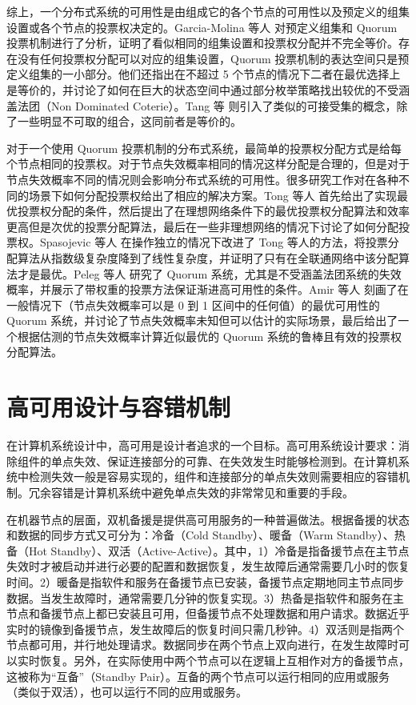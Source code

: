综上，一个分布式系统的可用性是由组成它的各个节点的可用性以及预定义的组集设置或各个节点的投票权决定的。Garcia-Molina 等人 \cite{Garcia-Molina:1985:AVD:4221.4223} 对预定义组集和 Quorum 投票机制进行了分析，证明了看似相同的组集设置和投票权分配并不完全等价。存在没有任何投票权分配可以对应的组集设置，Quorum 投票机制的表达空间只是预定义组集的一小部分。他们还指出在不超过 5 个节点的情况下二者在最优选择上是等价的，并讨论了如何在巨大的状态空间中通过部分枚举策略找出较优的不受涵盖法团（Non Dominated Coterie）。Tang 等 \cite{Tang:1989:SPS:67544.67809} 则引入了类似的可接受集的概念，除了一些明显不可取的组合，这同前者是等价的。

对于一个使用 Quorum 投票机制的分布式系统，最简单的投票权分配方式是给每个节点相同的投票权。对于节点失效概率相同的情况这样分配是合理的，但是对于节点失效概率不同的情况则会影响分布式系统的可用性。很多研究工作对在各种不同的场景下如何分配投票权给出了相应的解决方案。Tong 等人 \cite{25789} 首先给出了实现最优投票权分配的条件，然后提出了在理想网络条件下的最优投票权分配算法和效率更高但是次优的投票分配算法，最后在一些非理想网络的情况下讨论了如何分配投票权。Spasojevic 等人 \cite{262589} 在操作独立的情况下改进了 Tong 等人的方法，将投票分配算法从指数级复杂度降到了线性复杂度，并证明了只有在全联通网络中该分配算法才是最优。Peleg 等人 \cite{Peleg1995210} 研究了 Quorum 系统，尤其是不受涵盖法团系统的失效概率，并展示了带权重的投票方法保证渐进高可用性的条件。Amir 等人 \cite{Amir1998223} 刻画了在一般情况下（节点失效概率可以是 0 到 1 区间中的任何值）的最优可用性的 Quorum 系统，并讨论了节点失效概率未知但可以估计的实际场景，最后给出了一个根据估测的节点失效概率计算近似最优的 Quorum 系统的鲁棒且有效的投票权分配算法。

\section{高可用设计与容错机制}
在计算机系统设计中，高可用是设计者追求的一个目标。高可用系统设计要求：消除组件的单点失效、保证连接部分的可靠、在失效发生时能够检测到。在计算机系统中检测失效一般是容易实现的，组件和连接部分的单点失效则需要相应的容错机制。冗余容错是计算机系统中避免单点失效的非常常见和重要的手段。

在机器节点的层面，双机备援是提供高可用服务的一种普遍做法。根据备援的状态和数据的同步方式又可分为：冷备（Cold Standby）、暖备（Warm Standby）、热备（Hot Standby）、双活（Active-Active）。其中，1）冷备是指备援节点在主节点失效时才被启动并进行必要的配置和数据恢复，发生故障后通常需要几小时的恢复时间。2）暖备是指软件和服务在备援节点已安装，备援节点定期地同主节点同步数据。当发生故障时，通常需要几分钟的恢复实现。3）热备是指软件和服务在主节点和备援节点上都已安装且可用，但备援节点不处理数据和用户请求。数据近乎实时的镜像到备援节点，发生故障后的恢复时间只需几秒钟。4）双活则是指两个节点都可用，并行地处理请求。数据同步在两个节点上双向进行，在发生故障时可以实时恢复。另外，在实际使用中两个节点可以在逻辑上互相作对方的备援节点，这被称为``互备''（Standby Pair）。互备的两个节点可以运行相同的应用或服务（类似于双活），也可以运行不同的应用或服务。

